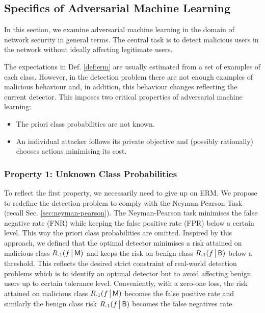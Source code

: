 \subsection{Specifics of Adversarial Machine Learning}\label{sec:specifics_of_aml}

In this section, we examine adversarial machine learning in the domain of network security in general terms. The central task is to detect malicious users in the network without ideally affecting legitimate users.

The expectations in Def. \ref{def:erm} are usually estimated from a set of examples of each class. However, in the detection problem there are not enough examples of malicious behaviour and, in addition, this behaviour changes reflecting the current detector. This imposes two critical properties of adversarial machine learning:

\begin{itemize}
\item
    The priori class probabilities are not known.
\item
    An individual attacker follows its private objective and (possibly rationally) chooses actions minimising its cost.
\end{itemize}

\subsubsection{Property 1: Unknown Class Probabilities}\label{sec:property_one}
To reflect the first property, we necessarily need to  give up on ERM. We propose to redefine the detection problem to comply with the Neyman-Pearson Task (recall Sec. \ref{sec:neyman-pearson}). The Neyman-Pearson task minimises the false negative rate (FNR) while keeping the false positive rate (FPR) below a certain level. This way the priori class probabilities are omitted. Inspired by this approach, we defined that the optimal detector minimises a risk attained on malicious class $R_{{\text{-}1}}(f \,\big|\, \mathsf{M})$ and keeps the risk on benign class $R_{{\text{-}1}}(f \,\big|\, \mathsf{B})$ below a threshold. This reflects the desired strict constraint of real-world detection problems which is to identify an optimal detector but to avoid affecting benign users up to certain tolerance level. Conveniently, with a zero-one loss, the risk attained on malicious class $R_{{\text{-}1}}(f \,\big|\, \mathsf{M})$ becomes the false positive rate and similarly the benign class risk $R_{{\text{-}1}}(f \,\big|\, \mathsf{B})$ becomes the false negatives rate.

